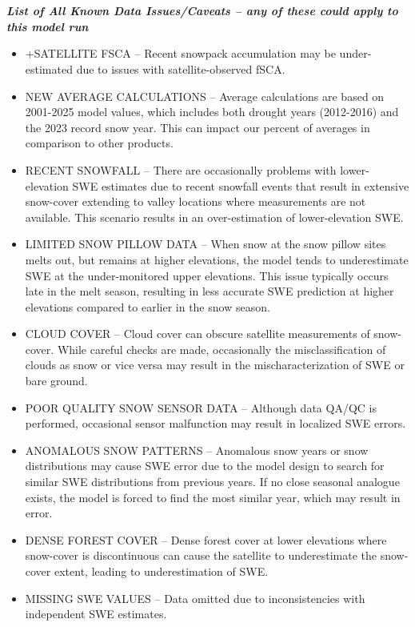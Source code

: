 \documentclass{article}
\begin{document}
\section*{}\label{sec:data_issues}
\noindent\textbf{\textit{List of All Known Data Issues/Caveats – any of these could apply to this model run}}
\begin{itemize}
    \item +SATELLITE FSCA – Recent snowpack accumulation may be under-estimated due to issues with satellite-observed fSCA.
    \item NEW AVERAGE CALCULATIONS – Average calculations are based on 2001-2025 model values, which includes both drought years (2012-2016) and the 2023 record snow year. This can impact our percent of averages in comparison to other products.
    \item RECENT SNOWFALL – There are occasionally problems with lower-elevation SWE estimates due to recent snowfall events that result in extensive snow-cover extending to valley locations where measurements are not available. This scenario results in an over-estimation of lower-elevation SWE.
    \item LIMITED SNOW PILLOW DATA – When snow at the snow pillow sites melts out, but remains at higher elevations, the model tends to underestimate SWE at the under-monitored upper elevations. This issue typically occurs late in the melt season, resulting in less accurate SWE prediction at higher elevations compared to earlier in the snow season.
    \item CLOUD COVER – Cloud cover can obscure satellite measurements of snow-cover. While careful checks are made, occasionally the misclassification of clouds as snow or vice versa may result in the mischaracterization of SWE or bare ground.
    \item POOR QUALITY SNOW SENSOR DATA – Although data QA/QC is performed, occasional sensor malfunction may result in localized SWE errors.
    \item ANOMALOUS SNOW PATTERNS – Anomalous snow years or snow distributions may cause SWE error due to the model design to search for similar SWE distributions from previous years. If no close seasonal analogue exists, the model is forced to find the most similar year, which may result in error.
    \item DENSE FOREST COVER – Dense forest cover at lower elevations where snow-cover is discontinuous can cause the satellite to underestimate the snow-cover extent, leading to underestimation of SWE.
    \item MISSING SWE VALUES – Data omitted due to inconsistencies with independent SWE estimates.

\end{itemize}
\end{document}
